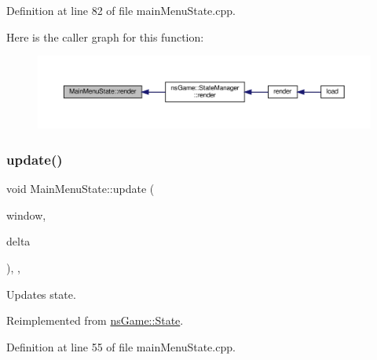 Definition at line 82 of file main\+Menu\+State.\+cpp.

Here is the caller graph for this function\+:\nopagebreak
\begin{figure}[H]
\begin{center}
\leavevmode
\includegraphics[width=350pt]{class_main_menu_state_a1f11855f3b961e7a71c7c4e16f0b3478_icgraph}
\end{center}
\end{figure}
\mbox{\label{class_main_menu_state_a7846cc7f1bd9b1fc40d77cc8f7644e03}} 
\subsubsection{\texorpdfstring{update()}{update()}}
{\footnotesize\ttfamily void Main\+Menu\+State\+::update (\begin{DoxyParamCaption}\item[{Min\+GL \&}]{window,  }\item[{unsigned}]{delta }\end{DoxyParamCaption})\hspace{0.3cm}{\ttfamily [inline]}, {\ttfamily [override]}, {\ttfamily [virtual]}}



Updates state. 



Reimplemented from \hyperlink{structns_game_1_1_state_ae809e89ac9df4a43ab90d5d5932e2bc7}{ns\+Game\+::\+State}.



Definition at line 55 of file main\+Menu\+State.\+cpp.

